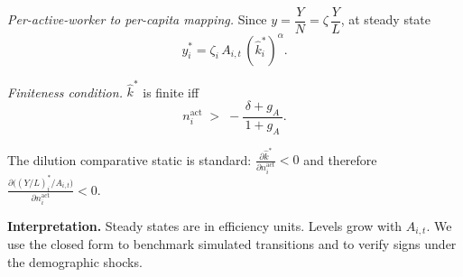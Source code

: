 \documentclass[12pt,a4paper]{article}
\begin{document}
\medskip
\noindent\textit{Per-active-worker to per-capita mapping.}
Since $y=\dfrac{Y}{N}=\zeta\,\dfrac{Y}{L}$, at steady state
\[
y_i^\ast=\zeta_i\,A_{i,t}\,(\hat{k}_i^\ast)^\alpha.
\]

\noindent\textit{Finiteness condition.}\;
\(\hat{k}^\ast\) is finite iff
\[
n^{\text{act}}_i \;>\; -\frac{\delta+g_A}{\,1+g_A\,}.
\]

\noindent The dilution comparative static is standard:
$\frac{\partial \hat{k}^\ast}{\partial n^{\text{act}}_i} < 0$ and therefore \(\frac{\partial \big((Y/L)_i^\ast / A_{i,t}\big)}{\partial n^{\text{act}}_i} < 0\).\\

\begin{mdframed}[backgroundcolor=gray!08,linewidth=0.5pt]
\textbf{Interpretation.} Steady states are in efficiency units. Levels grow with \(A_{i,t}\). We use the closed form to benchmark simulated transitions and to verify signs under the demographic shocks.
\end{mdframed}



\end{document}
